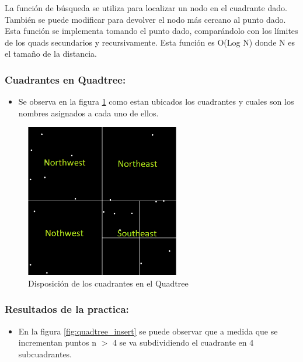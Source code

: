 \documentclass{article}
\begin{document}
La función de búsqueda se utiliza para localizar un nodo en el cuadrante dado. También se puede modificar para devolver el nodo más cercano al punto dado. Esta función se implementa tomando el punto dado, comparándolo con los límites de los quads secundarios y recursivamente. Esta función es O(Log N) donde N es el tamaño de la distancia.
\clearpage
\subsubsection{Cuadrantes en Quadtree: }
\begin{itemize}
	\item Se observa en la figura \ref{fig:quadtree_cuadrante} como estan ubicados los cuadrantes y cuales son los nombres asignados a cada uno de ellos.
\end{itemize}

\begin{figure}[h!]
	\centering
	\includegraphics[width=0.6\textwidth]{img/quadtree_cuadrante.png}
	\caption{Disposición de los cuadrantes en el Quadtree}
	\label{fig:quadtree_cuadrante}
\end{figure}

\subsubsection{Resultados de la practica: }

\begin{itemize}
	\item En la figura \ref{fig:quadtree_insert} se puede observar que a medida que se incrementan puntos n $>$ 4 se va subdividiendo el cuadrante en 4 subcuadrantes.
\end{itemize}
\end{document}
